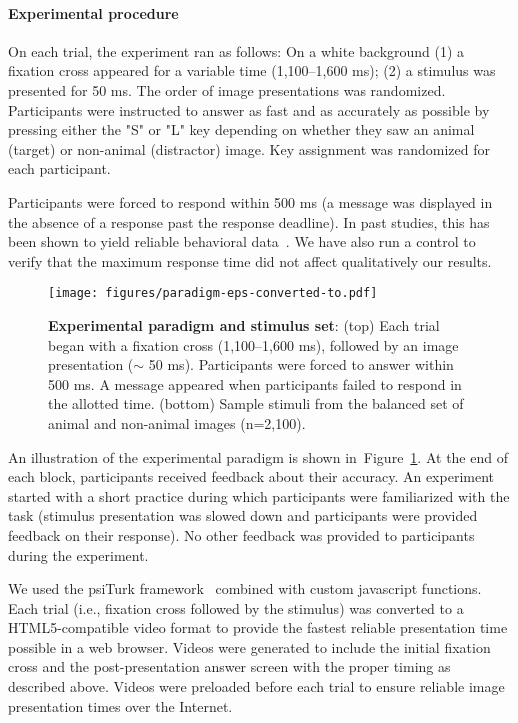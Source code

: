 \documentclass{article}
\begin{document}
\paragraph{Experimental procedure}


On each trial, the experiment ran as follows: On a white background (1) a fixation cross appeared for a variable time (1,100--1,600 ms); (2) a stimulus was presented for 50 ms. The order of image presentations was randomized. Participants were instructed to answer as fast and as accurately as possible by pressing either the "S" or "L" key depending on whether they saw an animal (target) or non-animal (distractor) image. Key assignment was randomized for each participant. 


Participants were forced to respond within 500 ms (a message was displayed in the absence of a response past the response deadline). In past studies, this has been shown to yield reliable behavioral data~\citep[e.g.][]{Sofer2015}. We have also run a control to verify that the maximum response time did not affect qualitatively our results.


\begin{figure}[t!]
  \begin{center}
    \texttt{[image: figures/paradigm-eps-converted-to.pdf]}
    \caption[Experimental paradigm]{\textbf{Experimental paradigm and stimulus set}: (top) Each trial began with a fixation cross (1,100--1,600 ms), followed by an image presentation ($\sim$ 50 ms). Participants were forced to answer within 500 ms. A message appeared when participants failed to respond in the allotted time. (bottom) Sample stimuli from the balanced set of animal and non-animal images  (n=2,100). 
    \label{fig:methods:paradigm}}
  \end{center}
\end{figure}


An illustration of the experimental paradigm is shown in~Figure~\ref{fig:methods:paradigm}. At the end of each block, participants received feedback about their accuracy. An experiment started with a short practice during which participants were familiarized with the task (stimulus presentation was slowed down and participants were provided feedback on their response). No other feedback was provided to participants during the experiment. 




We used the psiTurk framework~\citep{mcdonnell2012psiturk} combined with custom javascript functions. Each trial (i.e., fixation cross followed by the stimulus) was converted to a HTML5-compatible video format to provide the fastest reliable presentation time possible in a web browser. Videos were generated to include the initial fixation cross and the post-presentation answer screen with the proper timing as described above. Videos were preloaded before each trial to ensure reliable image presentation times over the Internet. 
\end{document}
